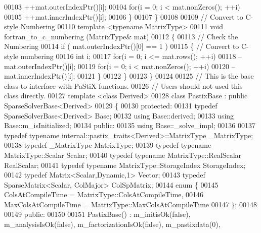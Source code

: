 \begin{DoxyCode}
00103         ++mat.outerIndexPtr()[i];
00104       \textcolor{keywordflow}{for}(i = 0; i < mat.nonZeros(); ++i)
00105         ++mat.innerIndexPtr()[i];
00106     \}
00107   \}
00108   
00109   \textcolor{comment}{// Convert to C-style Numbering}
00110   \textcolor{keyword}{template} <\textcolor{keyword}{typename} MatrixType>
00111   \textcolor{keywordtype}{void} fortran\_to\_c\_numbering (MatrixType& mat)
00112   \{
00113     \textcolor{comment}{// Check the Numbering}
00114     \textcolor{keywordflow}{if} ( mat.outerIndexPtr()[0] == 1 ) 
00115     \{ \textcolor{comment}{// Convert to C-style numbering}
00116       \textcolor{keywordtype}{int} i;
00117       \textcolor{keywordflow}{for}(i = 0; i <= mat.rows(); ++i)
00118         --mat.outerIndexPtr()[i];
00119       \textcolor{keywordflow}{for}(i = 0; i < mat.nonZeros(); ++i)
00120         --mat.innerIndexPtr()[i];
00121     \}
00122   \}
00123 \}
00124 
00125 \textcolor{comment}{// This is the base class to interface with PaStiX functions. }
00126 \textcolor{comment}{// Users should not used this class directly. }
00127 \textcolor{keyword}{template} <\textcolor{keyword}{class} Derived>
00128 \textcolor{keyword}{class }PastixBase : \textcolor{keyword}{public} SparseSolverBase<Derived>
00129 \{
00130   \textcolor{keyword}{protected}:
00131     \textcolor{keyword}{typedef} SparseSolverBase<Derived> Base;
00132     \textcolor{keyword}{using} Base::derived;
00133     \textcolor{keyword}{using} Base::m\_isInitialized;
00134   \textcolor{keyword}{public}:
00135     \textcolor{keyword}{using} Base::\_solve\_impl;
00136     
00137     \textcolor{keyword}{typedef} \textcolor{keyword}{typename} internal::pastix\_traits<Derived>::MatrixType \_MatrixType;
00138     \textcolor{keyword}{typedef} \_MatrixType MatrixType;
00139     \textcolor{keyword}{typedef} \textcolor{keyword}{typename} MatrixType::Scalar Scalar;
00140     \textcolor{keyword}{typedef} \textcolor{keyword}{typename} MatrixType::RealScalar RealScalar;
00141     \textcolor{keyword}{typedef} \textcolor{keyword}{typename} MatrixType::StorageIndex StorageIndex;
00142     \textcolor{keyword}{typedef} Matrix<Scalar,Dynamic,1> Vector;
00143     \textcolor{keyword}{typedef} SparseMatrix<Scalar, ColMajor> ColSpMatrix;
00144     \textcolor{keyword}{enum} \{
00145       ColsAtCompileTime = MatrixType::ColsAtCompileTime,
00146       MaxColsAtCompileTime = MatrixType::MaxColsAtCompileTime
00147     \};
00148     
00149   \textcolor{keyword}{public}:
00150     
00151     PastixBase() : m\_initisOk(false), m\_analysisIsOk(false), m\_factorizationIsOk(false), m\_pastixdata(0), 

\end{DoxyCode}
